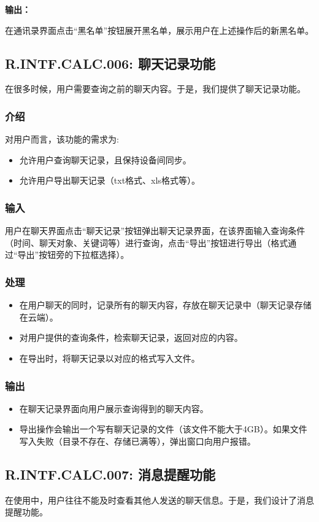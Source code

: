\textbf{输出：}

在通讯录界面点击“黑名单”按钮展开黑名单，展示用户在上述操作后的新黑名单。

\subsection{R.INTF.CALC.006: 聊天记录功能}
在很多时候，用户需要查询之前的聊天内容。于是，我们提供了聊天记录功能。
\subsubsection{介绍}
对用户而言，该功能的需求为:
\begin{itemize}
  \item 允许用户查询聊天记录，且保持设备间同步。
  \item 允许用户导出聊天记录（txt格式、xls格式等）。
\end{itemize}
\subsubsection{输入}
用户在聊天界面点击“聊天记录”按钮弹出聊天记录界面，在该界面输入查询条件（时间、聊天对象、关键词等）进行查询，点击“导出”按钮进行导出（格式通过“导出”按钮旁的下拉框选择）。
\subsubsection{处理}
\begin{itemize}
  \item 在用户聊天的同时，记录所有的聊天内容，存放在聊天记录中（聊天记录存储在云端）。
  \item 对用户提供的查询条件，检索聊天记录，返回对应的内容。
  \item 在导出时，将聊天记录以对应的格式写入文件。
\end{itemize}
\subsubsection{输出}
\begin{itemize}
  \item 在聊天记录界面向用户展示查询得到的聊天内容。
  \item 导出操作会输出一个写有聊天记录的文件（该文件不能大于4GB）。如果文件写入失败（目录不存在、存储已满等），弹出窗口向用户报错。
\end{itemize}

\subsection{R.INTF.CALC.007: 消息提醒功能}
在使用中，用户往往不能及时查看其他人发送的聊天信息。于是，我们设计了消息提醒功能。
